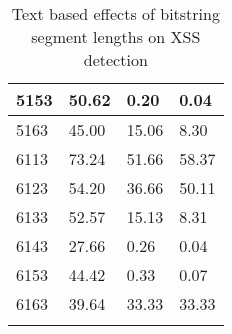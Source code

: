 \begin{appendices}
\begin{longtable}{|p{1.5in}|p{1in}|p{1in}|p{1in}|}
	5153 &  50.62 &   0.20 &   0.04 \\ \hline
	5163 &  45.00 &  15.06 &   8.30 \\ \hline
	6113 &  73.24 &  51.66 &  58.37 \\ \hline
	6123 &  54.20 &  36.66 &  50.11 \\ \hline
	6133 &  52.57 &  15.13 &   8.31 \\ \hline
	6143 &  27.66 &   0.26 &   0.04 \\ \hline
	6153 &  44.42 &   0.33 &   0.07 \\ \hline
	6163 &  39.64 &  33.33 &  33.33 \\ \hline
	\caption[]{Text based effects of bitstring segment lengths on XSS detection}
	\label{app:xssBitstringTest}
\end{longtable}


\end{appendices}
